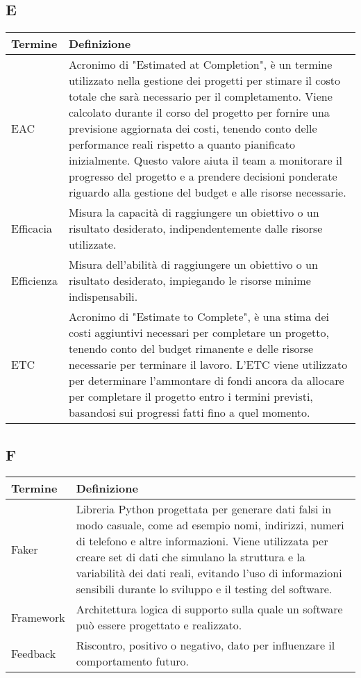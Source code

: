 \documentclass[10pt]{article}
\begin{document}
\subsection{E} %
\begin{longtable}{|>{\centering\arraybackslash}m{2.5cm}|>{\arraybackslash}m{12.5cm}|}
\hline
\rowcolor[gray]{0.8}
\textbf{Termine} & \textbf{Definizione}\\
\endhead
\hline
EAC & Acronimo di "Estimated at Completion", è un termine utilizzato nella gestione dei progetti per stimare il costo totale che sarà necessario per il completamento. Viene calcolato durante il corso del progetto per fornire una previsione aggiornata dei costi, tenendo conto delle performance reali rispetto a quanto pianificato inizialmente. Questo valore aiuta il team a monitorare il progresso del progetto e a prendere decisioni ponderate riguardo alla gestione del budget e alle risorse necessarie.\\
\hline
Efficacia & Misura la capacità di raggiungere un obiettivo o un risultato desiderato, indipendentemente dalle risorse utilizzate.\\
\hline
Efficienza & Misura dell'abilità di raggiungere un obiettivo o un risultato desiderato, impiegando le risorse minime indispensabili.\\
\hline
ETC & Acronimo di "Estimate to Complete", è una stima dei costi aggiuntivi necessari per completare un progetto, tenendo conto del budget rimanente e delle risorse necessarie per terminare il lavoro. L'ETC viene utilizzato per determinare l'ammontare di fondi ancora da allocare per completare il progetto entro i termini previsti, basandosi sui progressi fatti fino a quel momento.\\
\hline
\end{longtable}

\subsection{F} %
\begin{longtable}{|>{\centering\arraybackslash}m{2.5cm}|>{\arraybackslash}m{12.5cm}|}
\hline
\rowcolor[gray]{0.8}
\textbf{Termine} & \textbf{Definizione}\\
\endhead
\hline
Faker & Libreria Python progettata per generare dati falsi in modo casuale, come ad esempio nomi, indirizzi, numeri di telefono e altre informazioni. Viene utilizzata per creare set di dati che simulano la struttura e la variabilità dei dati reali, evitando l'uso di informazioni sensibili durante lo sviluppo e il testing del software.\\
\hline
Framework & Architettura logica di supporto sulla quale un software può essere progettato e realizzato.\\
\hline
Feedback & Riscontro, positivo o negativo, dato per influenzare il comportamento futuro.\\
\hline
\end{longtable}
\end{document}
